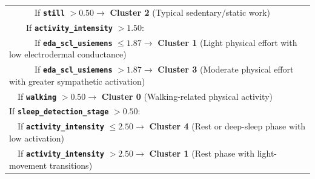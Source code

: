 \documentclass[a4paper,fleqn]{cas-sc}
\begin{document}
\begin{center}
{\begin{tabular}{l}
~~~~~~If \textbf{\texttt{still}} $> 0.50 \rightarrow$ \textbf{Cluster 2} (Typical sedentary/static work) \\
~~~~If \textbf{\texttt{activity\_intensity}} $> 1.50$: \\
~~~~~~If \textbf{\texttt{eda\_scl\_usiemens}} $\le 1.87 \rightarrow$ \textbf{Cluster 1} (Light physical effort with low electrodermal conductance) \\
~~~~~~If \textbf{\texttt{eda\_scl\_usiemens}} $> 1.87 \rightarrow$ \textbf{Cluster 3} (Moderate physical effort with greater sympathetic activation) \\
~~If \textbf{\texttt{walking}} $> 0.50 \rightarrow$ \textbf{Cluster 0} (Walking-related physical activity) \\
If \textbf{\texttt{sleep\_detection\_stage}} $> 0.50$: \\
~~If \textbf{\texttt{activity\_intensity}} $\le 2.50 \rightarrow$ \textbf{Cluster 4} (Rest or deep-sleep phase with low activation) \\
~~If \textbf{\texttt{activity\_intensity}} $> 2.50 \rightarrow$ \textbf{Cluster 1} (Rest phase with light-movement transitions) \\
\hline
\end{tabular}%
}
\end{center}
\end{document}
